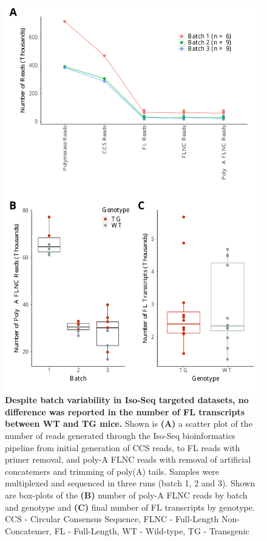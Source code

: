 \begin{figure}[!htp]
	\begin{center}
		\includegraphics[page=1,trim={0 1cm 0 0},clip,scale = 0.55]{Figures/TargetedTranscriptome.pdf}
	\end{center}
	\captionsetup{width=0.95\textwidth}
	\caption[Iso-Seq sequencing metrics from targeted profiling of rTg4510 mice]%
	{\textbf{Despite batch variability in Iso-Seq targeted datasets, no difference was reported in the number of FL transcripts between WT and TG mice.} Shown is \textbf{(A)} a scatter plot of the number of reads generated through the Iso-Seq bioinformatics pipeline from initial generation of CCS reads, to FL reads with primer removal, and poly-A FLNC reads with removal of artificial concatemers and trimming of poly(A) tails. Samples were multiplexed and sequenced in three runs (batch 1, 2 and 3). Shown are box-plots of the \textbf{(B)} number of poly-A FLNC reads by batch and genotype and \textbf{(C)} final number of FL transcripts by genotype. CCS - Circular Consensus Sequence, FLNC - Full-Length Non-Concatemer, FL - Full-Length, WT - Wild-type, TG - Transgenic}
	\label{fig:isoseq_targeted_run_output}
\end{figure}

